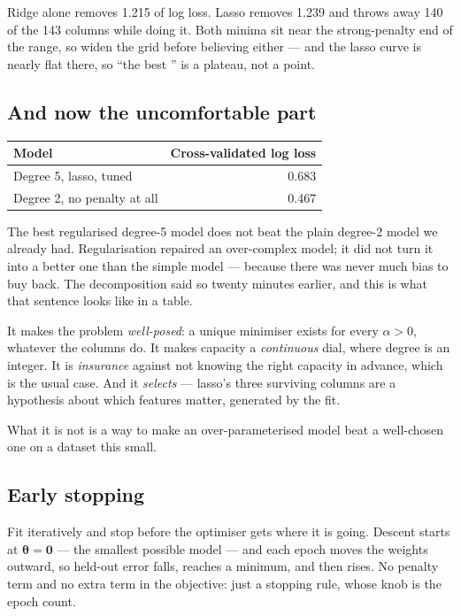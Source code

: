 \documentclass[11pt,a4paper]{article}
\begin{document}
Ridge alone removes 1.215 of log loss. Lasso removes 1.239 and throws away 140
of the 143 columns while doing it. Both minima sit near the strong-penalty end
of the range, so widen the grid before believing either --- and the lasso curve
is nearly flat there, so ``the best '' is a plateau, not a point.

\subsection{And now the uncomfortable part}

\begin{center}
\small
\begin{tabular}{lr}
\toprule
\textbf{Model} & \textbf{Cross-validated log loss} \\
\midrule
Degree 5, lasso, tuned & 0.683 \\
Degree 2, no penalty at all & 0.467 \\
\bottomrule
\end{tabular}
\end{center}

The best regularised degree-5 model does not beat the plain degree-2 model we
already had. Regularisation repaired an over-complex model; it did not turn it
into a better one than the simple model --- because there was never much bias
to buy back. The decomposition said so twenty minutes earlier, and this is what
that sentence looks like in a table.

\begin{keybox}[title={So what is a penalty actually for?}]
It makes the problem \emph{well-posed}: a unique minimiser exists for every
$\alpha > 0$, whatever the columns do. It makes capacity a \emph{continuous}
dial, where degree is an integer. It is \emph{insurance} against not knowing
the right capacity in advance, which is the usual case. And it \emph{selects}
--- lasso's three surviving columns are a hypothesis about which features
matter, generated by the fit.

What it is not is a way to make an over-parameterised model beat a well-chosen
one on a dataset this small.
\end{keybox}

\subsection{Early stopping}

Fit iteratively and stop before the optimiser gets where it is going. Descent
starts at $\boldsymbol\theta = \mathbf{0}$ --- the smallest possible model ---
and each epoch moves the weights outward, so held-out error falls, reaches a
minimum, and then rises. No penalty term and no extra term in the objective:
just a stopping rule, whose knob is the epoch count.
\end{document}
